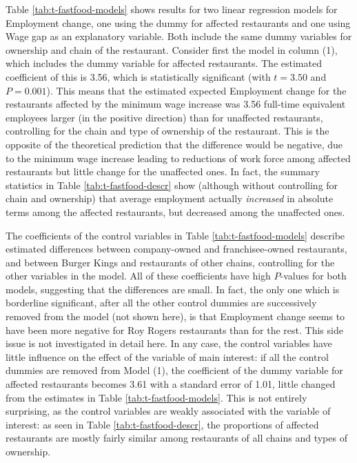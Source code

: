 \documentclass[11pt,a4paper,openany]{book}
\begin{document}
Table \ref{tab:t-fastfood-models} shows results for two linear
regression models for Employment change, one using the dummy for
affected restaurants and one using Wage gap as an explanatory variable.
Both include the same dummy variables for ownership and chain of the
restaurant. Consider first the model in column (1), which includes the
dummy variable for affected restaurants. The estimated coefficient of
this is 3.56, which is statistically significant (with \(t=3.50\) and
\(P=0.001\)). This means that the estimated expected Employment change
for the restaurants affected by the minimum wage increase was 3.56
full-time equivalent employees larger (in the positive direction) than
for unaffected restaurants, controlling for the chain and type of
ownership of the restaurant. This is the opposite of the theoretical
prediction that the difference would be negative, due to the minimum
wage increase leading to reductions of work force among affected
restaurants but little change for the unaffected ones. In fact, the
summary statistics in Table \ref{tab:t-fastfood-descr} show (although
without controlling for chain and ownership) that average employment
actually \emph{increased} in absolute terms among the affected
restaurants, but decreased among the unaffected ones.

The coefficients of the control variables in Table
\ref{tab:t-fastfood-models} describe estimated differences between
company-owned and franchisee-owned restaurants, and between Burger Kings
and restaurants of other chains, controlling for the other variables in
the model. All of these coefficients have high \(P\)-values for both
models, suggesting that the differences are small. In fact, the only one
which is borderline significant, after all the other control dummies are
successively removed from the model (not shown here), is that Employment
change seems to have been more negative for Roy Rogers restaurants than
for the rest. This side issue is not investigated in detail here. In any
case, the control variables have little influence on the effect of the
variable of main interest: if all the control dummies are removed from
Model (1), the coefficient of the dummy variable for affected
restaurants becomes 3.61 with a standard error of 1.01, little changed
from the estimates in Table \ref{tab:t-fastfood-models}. This is not
entirely surprising, as the control variables are weakly associated with
the variable of interest: as seen in Table \ref{tab:t-fastfood-descr},
the proportions of affected restaurants are mostly fairly similar among
restaurants of all chains and types of ownership.
\end{document}
